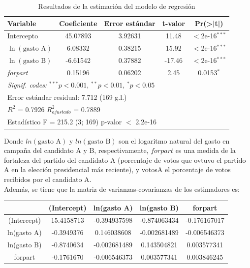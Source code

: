 \documentclass[12pt]{article}
\begin{document}
\begin{enumerate}
\begin{table}[H]
\centering
\caption{Resultados de la estimación del modelo de regresión}
\label{tab:regresion}
\begin{tabular}{lcccc}
\toprule
\textbf{Variable} & \textbf{Coeficiente} & \textbf{Error estándar} & \textbf{t-valor} & \textbf{Pr(>|t|)} \\
\midrule
Intercepto & 45.07893 & 3.92631 & 11.48 & $<$2e-16$^{***}$ \\
$\ln(\text{gasto A})$ & 6.08332 & 0.38215 & 15.92 & $<$2e-16$^{***}$ \\
$\ln(\text{gasto B})$ & -6.61542 & 0.37882 & -17.46 & $<$2e-16$^{***}$ \\
\textit{forpart} & 0.15196 & 0.06202 & 2.45 & 0.0153$^{*}$ \\
\midrule
\multicolumn{5}{l}{\textit{Signif. codes:} $^{***}p<0.001$, $^{**}p<0.01$, $^{*}p<0.05$} \\
\midrule
\multicolumn{5}{l}{Error estándar residual: 7.712 (169 g.l.)} \\
\multicolumn{5}{l}{$R^2$ = 0.7926 \quad $R^2_{ajustado}$ = 0.7889} \\
\multicolumn{5}{l}{Estadístico F = 215.2 (3; 169) \quad p-valor $<$ 2.2e-16} \\
\bottomrule
\end{tabular}
\end{table}

Donde $ln(\text{gasto A})$ y $ln(\text{gasto B})$ son el logaritmo natural del gasto en campaña del candidato A y B, respectivamente, $forpart$ es una medida de la fortaleza del partido del candidato A (porcentaje de votos que ovtuvo el partido A en la elección presidencial más reciente), y votosA el porcentaje de votos recibidos por el candidato A.\\

Además, se tiene que la matriz de varianzas-covarianzas de los estimadores es:

\begin{table}[H]
    \centering
    \begin{tabular}{c|c|c|c|c}
 & (Intercept) & ln(gasto A) & ln(gasto B)	& forpart\\\hline
(Intercept)	& 15.4158713 & -0.394937598	& -0.874063434 & -0.176167017\\
ln(gasto A)	& -0.3949376 & 0.146038608 & -0.002681489 & -0.006546373\\
ln(gasto B)	& -0.8740634 & -0.002681489	& 0.143504821 & 0.003577341\\
forpart	& -0.1761670 & -0.006546373	& 0.003577341 & 0.003846245\\
    \end{tabular}
\end{table}


\end{enumerate}
\end{document}
